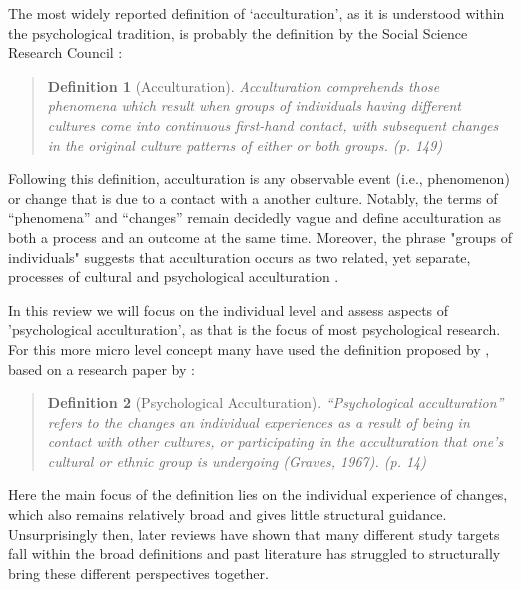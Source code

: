 \documentclass[man, 12pt, a4paper]{apa7}
\newtheorem{definition}{Definition}
\begin{document}
The most widely reported definition of `acculturation', as it is understood within the psychological tradition, is probably the definition by the Social Science Research Council \citep[][]{Redfield1936}:
\begin{quote}
    \begin{definition}[Acculturation]
        Acculturation comprehends those phenomena which result when groups of individuals having different cultures come into continuous first-hand contact, with subsequent changes in the original culture patterns of either or both groups. (p. 149)
    \end{definition}  
\end{quote}
Following this definition, acculturation is any observable event (i.e., phenomenon) or change that is due to a contact with a another culture. Notably, the terms of “phenomena” and “changes” remain decidedly vague and define acculturation as both a process and an outcome at the same time. Moreover, the phrase "groups of individuals" suggests that acculturation occurs as two related, yet separate, processes of cultural and psychological acculturation \citep[also see,][]{Sam2006b, Berry2005}.

In this review we will focus on the individual level and assess aspects of 'psychological acculturation', as that is the focus of most psychological research. For this more micro level concept many have used the definition proposed by \citet[][]{Sam2006b}, based on a research paper by \citet{Graves1967}: 
\begin{quote}
    \begin{definition}[Psychological Acculturation]
        “Psychological acculturation” refers to the changes an individual experiences as a result of being in contact with other cultures, or participating in the acculturation that one’s cultural or ethnic group is undergoing (Graves, 1967). (p. 14)
    \end{definition}
\end{quote}
Here the main focus of the definition lies on the individual experience of changes, which also remains relatively broad and gives little structural guidance. Unsurprisingly then, later reviews have shown that many different study targets fall within the broad definitions \citep[e.g.,][]{Ward2001} and past literature has struggled to structurally bring these different perspectives together.

\end{document}
